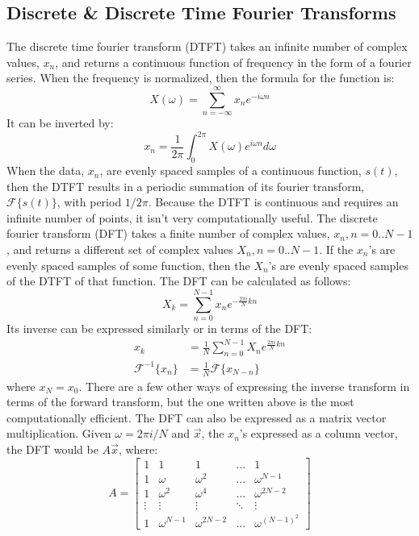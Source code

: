 \subsection{Discrete \& Discrete Time Fourier Transforms}
	The discrete time fourier transform (DTFT) takes an infinite number of complex values, $x_n$, and returns a continuous function of frequency in the form of a fourier series. When the frequency is normalized, then the formula for the function is:
	\[X(\omega)=\sum_{n=-\infty}^\infty x_n e^{-i\omega n}\]
	It can be inverted by:
	\[x_n=\frac{1}{2\pi}\int_0^{2\pi}X(\omega)e^{i\omega n}d\omega\]
	When the data, $x_n$, are evenly spaced samples of a continuous function, $s(t)$, then the DTFT results in a periodic summation of its fourier transform, $\mathcal{F}\{s(t)\}$, with period $1/{2\pi}$. Because the DTFT is continuous and requires an infinite number of points, it isn't very computationally useful. The discrete fourier transform (DFT) takes a finite number of complex values, $x_n, n=0..N-1$, and returns a different set of complex values $X_n, n=0..N-1$. If the $x_n$'s are evenly spaced samples of some function, then the $X_n$'s are evenly spaced samples of the DTFT of that function. The DFT can be calculated as follows:
	\[X_k=\sum_{n=0}^{N-1}x_n e^{-\frac{2\pi i}{N}kn}\]
	Its inverse can be expressed similarly or in terms of the DFT:
	\begin{align*}
		x_k&=\frac{1}{N}\sum_{n=0}^{N-1}X_n e^{\frac{2\pi i}{N}kn} \\
		\mathcal{F}^{-1}\{x_n\}&=\frac{1}{N}\mathcal{F}\{x_{N-n}\}
	\end{align*}
	where $x_N=x_0$. There are a few other ways of expressing the inverse transform in terms of the forward transform, but the one written above is the most computationally efficient. The DFT can also be expressed as a matrix vector multiplication. Given $\omega=2\pi i /N$ and $\vec{x}$, the $x_n$'s expressed as a column vector, the DFT would be $A\vec{x}$, where:
	\[A=
	\begin{bmatrix}
		1      & 1            & 1             & \dots  & 1                \\
		1      & \omega       & \omega^2      & \dots  & \omega^{N-1}     \\
		1      & \omega^2     & \omega^4      & \dots  & \omega^{2N-2}    \\
		\vdots & \vdots       & \vdots        & \ddots & \vdots           \\
		1      & \omega^{N-1} & \omega^{2N-2} & \dots  & \omega^{(N-1)^2}
		\end{bmatrix}\]
